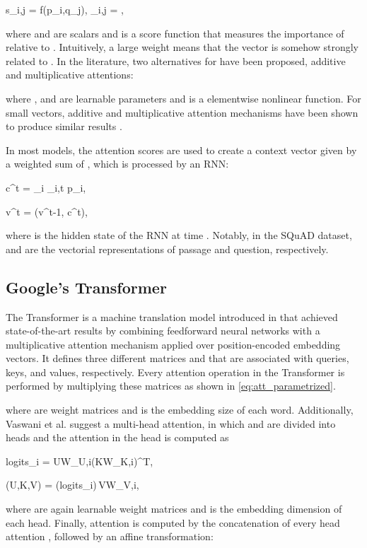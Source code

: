 \documentclass[conference, letterpaper, 10pt]{IEEEtran}
\begin{document}
\label{eq:s}
s_{i,j} = f(p_i,q_j),
\label{eq:alpha_i}
\alpha_{i,j} = ,

where  and  are scalars and  is a score function that measures the importance of  relative to .
Intuitively, a large weight  means that the vector  is somehow strongly related to .
In the literature, two alternatives for  have been proposed, additive \cite{Bahdanau2014} and multiplicative \cite{Luong2015} attentions:


where ,  and  are learnable parameters and  is a elementwise nonlinear function. For small vectors, additive and multiplicative attention mechanisms have been shown to produce similar results \cite{BritzGLL17}. 

In most models, the attention scores  are used to create a context vector  given by a weighted sum of , which is processed by an RNN:


c^t = \sum_i \alpha_{i,t} p_i,

 v^t = (v^{t-1}, c^t),

where  is the hidden state of the RNN at time . Notably, in the SQuAD dataset,  and  are the vectorial representations of passage and question, respectively.

\subsection{Google's Transformer}
The Transformer is a machine translation model introduced in \cite{Vaswani} that achieved state-of-the-art results by combining feedforward neural networks with a multiplicative attention mechanism applied over position-encoded embedding vectors. It defines three different matrices  and  that are associated with queries, keys, and values, respectively. Every attention operation in the Transformer is performed by multiplying these matrices as shown in \eqref{eq:att_parametrized}.


where  are weight matrices and  is the embedding size of each word. 
Additionally, Vaswani et al. \cite{Vaswani} suggest a multi-head attention, in which  and  are divided into  heads and the attention in the  head is computed as


    logits_i = UW_{U,i}(KW_{K,i})^T,

    (U,K,V) = \left(logits_i\right)\,VW_{V,i},

where   are again learnable weight matrices and  is the embedding dimension of each head. Finally, attention is computed by the concatenation of every head attention , followed by an affine transformation:
\end{document}
